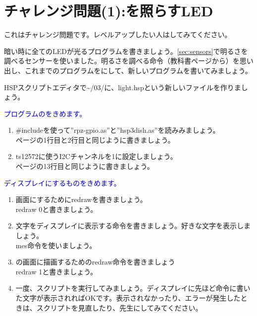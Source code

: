 \newpage
\section{チャレンジ問題(1):を照らすLED}
\label{Yamiyo}
これはチャレンジ問題です。レベルアップしたい人はしてみてください。

暗い時に全てのLEDが光るプログラムを書きましょう。\ref{sec:sensors}で明るさを調べるセンサーを使いました。明るさを調べる命令（教科書\pageref{sec:sensors}ページから）を思い出し、これまでのプログラムをにして、新しいプログラムを書いてみましょう。\\
\begin{enumerate}
\renewcommand{\theenumii}{\arabic{enumii}}
\renewcommand{\labelenumii}{\theenumi.\theenumii}
\item HSPスクリプトエディタで\textasciitilde /03/に、light.hspという新しいファイルを作りましょう。
\textcolor{blue}{\item プログラムのをきめます。}
\begin{enumerate}
\item \#includeを使って”rpz-gpio.as”と”hsp3dish.as”を読みみましょう。\\
\pageref{sensors.hsp}ページの1行目と2行目と同じように書きましょう。
\item ts12572に使うI2Cチャンネルを1に設定しましょう。\\
\pageref{sensors.hsp}ページの13行目と同じように書きましょう。
\end{enumerate}
\textcolor{blue}{\item ディスプレイにするものをきめます。}
\begin{enumerate}
\item {}画面にするためにredrawを書きましょう。\\
redraw 0と書きましょう。
\item 文字をディスプレイに表示する命令を書きましょう。好きな文字を表示しましょう。\\
mes命令を使いましょう。
\item {}の画面に描画するためのredraw命令を書きましょう\\
redraw 1と書きましょう。
\item 一度、スクリプトを実行してみましょう。ディスプレイに先ほど命令に書いた文字が表示されればOKです。表示されなかったり、エラーが発生したときは、スクリプトを見直したり、先生にしてみてください。

\end{enumerate}
\end{enumerate}
